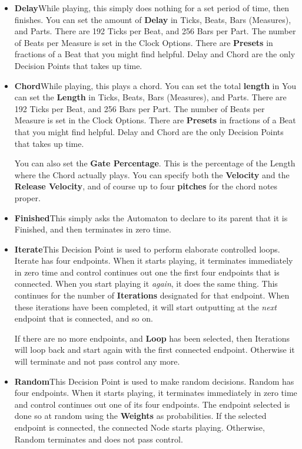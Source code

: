\documentclass[twoside,10pt]{article}
\begin{document}
\begin{itemize}
\item{\bf Delay}\quad While playing, this simply does nothing for a set period of time, then finishes.  You can set the amount of {\bf Delay} in Ticks, Beats, Bars (Measures), and Parts.  There are 192 Ticks per Beat, and 256 Bars per Part.  The number of Beats per Measure is set in the Clock Options.  There are {\bf Presets} in fractions of a Beat that you might find helpful.  Delay and Chord are the only Decision Points that takes up time.

\item{\bf Chord}\quad While playing, this plays a chord.  You can set the total {\bf length} in  You can set the {\bf Length} in Ticks, Beats, Bars (Measures), and Parts.  There are 192 Ticks per Beat, and 256 Bars per Part.  The number of Beats per Measure is set in the Clock Options.  There are {\bf Presets} in fractions of a Beat that you might find helpful.  Delay and Chord are the only Decision Points that takes up time.

You can also set the {\bf Gate Percentage}.  This is the percentage of the Length where the Chord actually plays.   You can specify both the {\bf Velocity} and the {\bf Release Velocity}, and of course up to four {\bf pitches} for the chord notes proper.

\item{\bf Finished}\quad This simply asks the Automaton to declare to its parent that it is Finished, and then terminates in zero time.

\item{\bf Iterate}\quad This Decision Point is used to perform elaborate controlled loops.  Iterate  has four endpoints.  When it starts playing, it terminates immediately in zero time and control continues out one the first four endpoints that is connected. When you start playing it {\it again}, it does the same thing.  This continues for the number of {\bf Iterations} designated for that endpoint.  When these iterations have been completed, it will start outputting at the {\it next} endpoint that is connected, and so on. 

If there are no more endpoints, and {\bf Loop} has been selected, then Iterations will loop back and start again with the first connected endpoint.  Otherwise it will terminate and not pass control any more.

\item{\bf Random}\quad This Decision Point is used to make random decisions.  Random has four endpoints.  When it starts playing, it terminates immediately in zero time and control continues out one of its four endpoints. The endpoint selected is done so at random using the {\bf Weights} as probabilities.  If the selected endpoint is connected, the connected Node starts playing.  Otherwise, Random terminates and does not pass control. 


\end{itemize}
\end{document}
